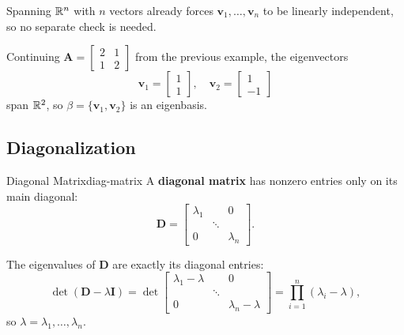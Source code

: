 \begin{remark}
  Spanning $\mathbb{R}^n$ with $n$ vectors already forces $\mathbf{v}_1, \ldots, \mathbf{v}_n$ to be linearly independent, so no separate check is needed.
\end{remark}

\begin{example}
  Continuing $\mathbf{A} =
    \begin{bmatrix}
      2 & 1 \\ 1 & 2
    \end{bmatrix}
  $ from the previous example, the eigenvectors
  \[
    \mathbf{v}_1 =
    \begin{bmatrix}
      1 \\ 1
    \end{bmatrix}
    ,
    \quad
    \mathbf{v}_2 =
    \begin{bmatrix}
      1 \\ -1
    \end{bmatrix}
  \]
  span $\mathbb{R}^2$, so $\beta = \{\mathbf{v}_1, \mathbf{v}_2\}$ is an eigenbasis.
\end{example}

\subsection{Diagonalization}

\begin{definition}{Diagonal Matrix}{diag-matrix}
  A \textbf{diagonal matrix} has nonzero entries only on its main diagonal:
  \[
    \mathbf{D} =
    \begin{bmatrix}
      \lambda_1 &        & 0         \\
                & \ddots &           \\
      0         &        & \lambda_n
    \end{bmatrix}
    .
  \]
\end{definition}

The eigenvalues of $\mathbf{D}$ are exactly its diagonal entries:
\[
  \det(\mathbf{D} - \lambda \mathbf{I}) =
  \det
  \begin{bmatrix}
    \lambda_1 - \lambda &        & 0                   \\
                        & \ddots &                     \\
    0                   &        & \lambda_n - \lambda
  \end{bmatrix}
  = \prod_{i=1}^{n} (\lambda_i - \lambda),
\]
so $\lambda = \lambda_1, \ldots, \lambda_n$.

